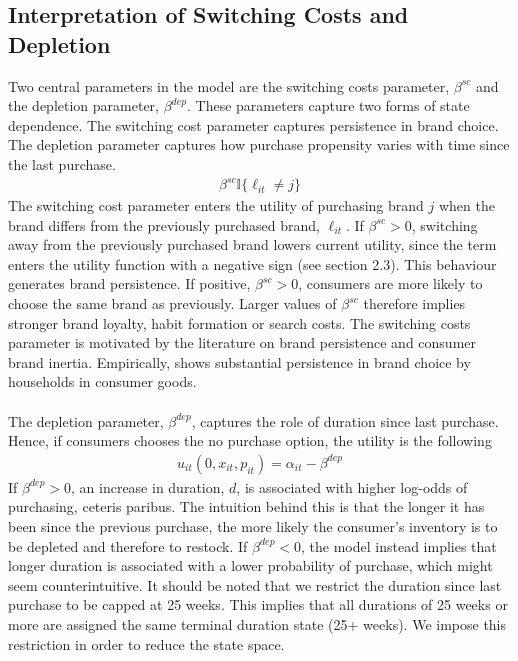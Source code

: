 \subsection{Interpretation of Switching Costs and Depletion}
Two central parameters in the model are the switching costs parameter, $\beta^{sc}$ and the depletion parameter, $\beta^{dep}$. These parameters capture two forms of state dependence. The switching cost parameter captures persistence in brand choice. The depletion parameter captures how purchase propensity varies with time since the last purchase.
\begin{align*}
    \beta^{sc} \mathbb{I} \{\ell_{it} \neq j\}
\end{align*}
The switching cost parameter enters the utility of purchasing brand $j$ when the brand differs from the previously purchased brand, $\ell_{it}$. If $\beta^{sc} > 0$, switching away from the previously purchased brand lowers current utility, since the term enters the utility function with a negative sign (see section 2.3). This behaviour generates brand persistence. If positive, $\beta^{sc} > 0$, consumers are more likely to choose the same brand as previously. Larger values of $\beta^{sc}$ therefore implies stronger brand loyalty, habit formation or search costs. The switching costs parameter is motivated by the literature on brand persistence and consumer brand inertia. Empirically, \cite{article} shows substantial persistence in brand choice by households in consumer goods. 
\\
\\
The depletion parameter, $\beta^{dep}$, captures the role of duration since last purchase. Hence, if consumers chooses the no purchase option, the utility is the following 
\begin{align*}
    u_{it}(0,x_{it},p_{it}) = \alpha_{it} - \beta^{dep}
\end{align*} 
If $\beta^{dep} > 0$, an increase in duration, $d$, is associated with higher log-odds of purchasing, ceteris paribus. The intuition behind this is that the longer it has been since the previous purchase, the more likely the consumer's inventory is to be depleted and therefore to restock. If $\beta^{dep}<0$, the model instead implies that longer duration is associated with a lower probability of purchase, which might seem counterintuitive. It should be noted that we restrict the duration since last purchase to be capped at 25 weeks. This implies that all durations of 25 weeks or more are assigned the same terminal duration state (25+ weeks). We impose this restriction in order to reduce the state space.  
